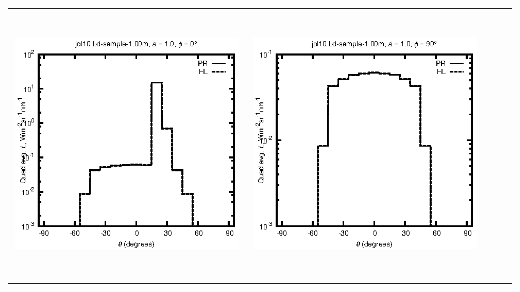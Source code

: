 \begin{tabular}{c c c c}
\includegraphics[height=7cm]{../eps/jol10_Ld_sample_1.00m_fwd.eps} &
\includegraphics[height=7cm]{../eps/jol10_Ld_sample_1.00m_cross.eps} \\
\end{tabular}

\pagebreak

